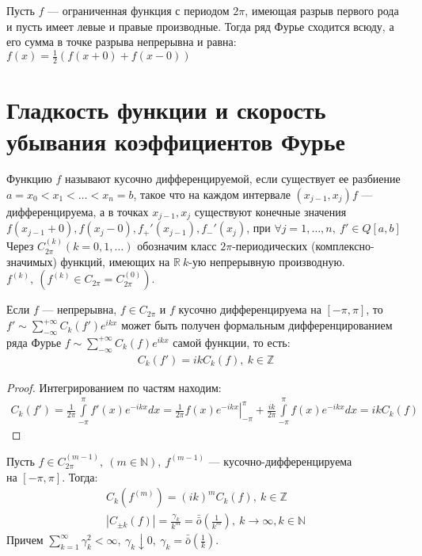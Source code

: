 \begin{consequence}
  Пусть $f$ --- ограниченная функция с периодом $2\pi$, имеющая разрыв первого
  рода и пусть имеет левые и правые производные. Тогда ряд Фурье сходится
  всюду, а его сумма в точке разрыва непрерывна и равна: $f(x) =
  \frac{1}{2}(f(x+0) + f(x-0))$
\end{consequence}

\section{Гладкость функции и скорость убывания коэффициентов Фурье}
\begin{definition}
  Функцию $f$ называют кусочно дифференцируемой, если существует ее разбиение
  $a = x_0 < x_1 < \dots < x_n = b$, такое что на каждом интервале $(x_{j-1},
  x_j) f$ --- дифференцируема, а в точках $x_{j-1}, x_j$ существуют конечные
  значения $f(x_{j-1}+0), f(x_j-0), f_+'(x_{j-1}), f_-'(x_j)$, при $\forall j =
  1, \dots, n, \ f' \in Q[a,b]$ \\
  Через $C_{2\pi}^{(k)} (k = 0, 1, \dots)$ обозначим класс $2\pi$-периодических
  (комплексно-значимых) функций, имеющих на $\mathbb{R} \ k$-ую непрерывную
  производную. $f^{(k)}, \ (f^{(k)} \in C_{2\pi} = C_{2\pi}^{(0)})$.
\end{definition}

\begin{lemma}
  Если $f$ --- непрерывна, $f \in C_{2\pi}$ и $f$ кусочно дифференцируема на
  $[-\pi, \pi]$, то $f' \sim \sum\limits_{-\infty}^{+\infty} C_k(f') e^{ikx}$
  может быть получен формальным дифференцированием ряда Фурье $f \sim
  \sum\limits_{-\infty}^{+\infty} C_k(f) e^{ikx}$ самой функции, то есть:
  \begin{gather}
    C_k(f') = ikC_k(f), \ k \in \mathbb{Z}
    \label{lem471:eq1}
  \end{gather}
\end{lemma}

\begin{proof}
  Интегрированием по частям находим:
  \begin{gather*}
    C_k(f') = \frac{1}{2\pi} \int\limits_{-\pi}^\pi f'(x) e^{-ikx} dx =
    \left. \frac{1}{2\pi} f(x) e^{-ikx} \right|_{-\pi}^\pi + \frac{ik}{2\pi}
    \int\limits_{-\pi}^\pi f(x) e^{-ikx} dx = ikC_k(f)
  \end{gather*}
\end{proof}

\begin{theorem}
  Пусть $f \in C_{2\pi}^{(m-1)}, \ (m \in \mathbb{N}), \ f^{(m-1)}$ ---
  кусочно-дифференцируема \\ на $[-\pi, \pi]$. Тогда:
  \begin{gather}
    C_k(f^{(m)}) = (ik)^m C_k(f), \ k \in \mathbb{Z}
    \label{th471:eq1} \\
    |C_{\pm k}(f)| = \frac{\gamma_k}{k^m} =
    \bar{\bar{o}}\left(\frac{1}{k^m}\right), \ k
    \to \infty, k \in \mathbb{N}
    \label{th471:eq2}
  \end{gather}
  Причем $\sum\limits_{k = 1}^{\infty} \gamma_k^2 < \infty, \ \gamma_k \downarrow
  0, \ \gamma_k = \bar{\bar{o}}\left(\frac{1}{k}\right)$.
\end{theorem}

